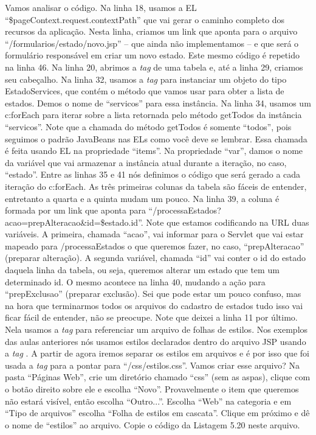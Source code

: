 Vamos analisar o código. Na linha 18, usamos a EL ``\${pageContext.request.contextPath}'' que vai gerar o caminho completo dos recursos da aplicação. Nesta linha, criamos um link que aponta para o arquivo ``/formularios/estado/novo.jsp'' – que ainda não implementamos – e que será o formulário responsável em criar um novo estado. Este mesmo código é repetido na linha 46. Na linha 20, abrimos a \textit{tag} de uma tabela e, até a linha 29, criamos seu cabeçalho. Na linha 32, usamos a \textit{tag}  para instanciar um objeto do tipo EstadoServices, que contém o método que vamos usar para obter a lista de estados. Demos o nome de ``servicos'' para essa instância. Na linha 34, usamos um c:forEach para iterar sobre a lista retornada pelo método getTodos da instância ``servicos''. Note que a chamada do método getTodos é somente ``todos'', pois seguimos o padrão JavaBeans nas ELs como você deve se lembrar. Essa chamada é feita usando EL na propriedade ``items''. Na propriedade ``var'', damos o nome da variável que vai armazenar a instância atual durante a iteração, no caso, ``estado''. Entre as linhas 35 e 41 nós definimos o código que será gerado a cada iteração do c:forEach. As três primeiras colunas da tabela são fáceis de entender, entretanto a quarta e a quinta mudam um pouco. Na linha 39, a coluna é formada por um link que aponta para ``/processaEstados?acao=prepAlteracao\&id=\${estado.id}''. Note que estamos codificando na URL duas variáveis. A primeira, chamada ``acao'', vai informar para o Servlet que vai estar mapeado para /processaEstados o que queremos fazer, no caso, ``prepAlteracao'' (preparar alteração). A segunda variável, chamada ``id'' vai conter o id do estado daquela linha da tabela, ou seja, queremos alterar um estado que tem um determinado id. O mesmo acontece na linha 40, mudando a ação para ``prepExclusao'' (preparar exclusão). Sei que pode estar um pouco confuso, mas na hora que terminarmos todos os arquivos do cadastro de estados tudo isso vai ficar fácil de entender, não se preocupe.
Note que deixei a linha 11 por último. Nela usamos a \textit{tag}  para referenciar um arquivo de folhas de estilos. Nos exemplos das aulas anteriores nós usamos estilos declarados dentro do arquivo JSP usando a \textit{tag} . A partir de agora iremos separar os estilos em arquivos e é por isso que foi usada a \textit{tag}  para a pontar para ``/css/estilos.css''. Vamos criar esse arquivo? Na pasta ``Páginas Web'', crie um diretório chamado ``css'' (sem as aspas), clique com o botão direito sobre ele e escolha ``Novo''. Provavelmente o item que queremos não estará visível, então escolha ``Outro...''. Escolha ``Web'' na categoria e em ``Tipo de arquivos'' escolha ``Folha de estilos em cascata''. Clique em próximo e dê o nome de ``estilos'' ao arquivo. Copie o código da Listagem 5.20 neste arquivo.

